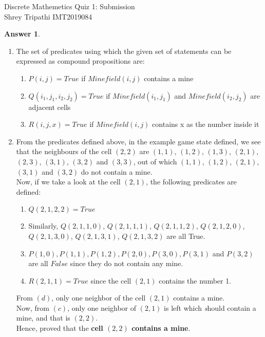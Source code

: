 \documentclass[a4paper]{article}
\theoremstyle{definition}
\newtheorem{answer}{Answer}
\begin{document}
\begin{center}
    {\Large Discrete Mathemetics Quiz 1: Submission}\\
    \vspace*{3mm}
    {\Large Shrey Tripathi IMT2019084}\\
\end{center}

\vspace*{2em}

\begin{answer}\
    \begin{enumerate}
        \item The set of predicates using which the given set of statements can be expressed as compound propositions are:
        \begin{enumerate}
            \item $P(i, j) = True$ if $Minefield(i, j)$ contains a mine
            \item $Q(i_1, j_1, i_2, j_2) = True$ if $Minefield(i_1, j_1)$ and $Minefield(i_2, j_2)$ are adjacent cells
            \item $R(i, j, x) = True$ if $Minefield(i, j)$ contains x as the number inside it
        \end{enumerate}
        \item From the predicates defined above, in the example game state defined, we see that the neighbours of the cell $(2, 2)$ are $(1, 1)$, $(1, 2)$, $(1, 3)$, $(2, 1)$, $(2, 3)$, $(3, 1)$, $(3, 2)$ and $(3, 3)$, out of which $(1, 1)$, $(1, 2)$, $(2, 1)$, $(3, 1)$ and $(3, 2)$ do not contain a mine.\\
        Now, if we take a look at the cell $(2, 1)$, the following predicates are defined:\begin{enumerate}
            \item $Q(2, 1, 2, 2) = True$
            \item Similarly, $Q(2, 1, 1, 0)$, $Q(2, 1, 1, 1)$, $Q(2, 1, 1, 2)$, $Q(2, 1, 2, 0)$, $Q(2, 1, 3, 0)$, $Q(2, 1, 3, 1)$, $Q(2, 1, 3, 2)$ are all True.
            \item $P(1, 0), P(1, 1), P(1, 2), P(2, 0), P(3, 0), P(3, 1)$ and $P(3, 2)$ are all $False$ since they do not contain any mine.
            \item $R(2, 1, 1) = True$ since the cell $(2, 1)$ contains the number 1. 
        \end{enumerate} From $(d)$, only one neighbor of the cell $(2, 1)$ contains a mine.\\
        Now, from $(c)$, only one neighbor of $(2, 1)$ is left which \textit should contain a mine, and that is $(2, 2)$.\\
        Hence, proved that the \textbf{cell $(2, 2)$ contains a mine}.
    \end{enumerate} 
\end{answer}
\end{document}

